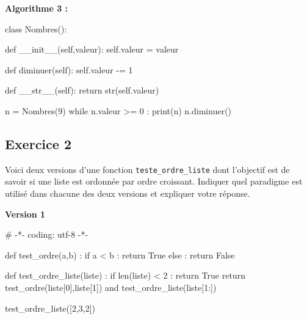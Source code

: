 \documentclass[
  a4paper,
  DIV=11,
  numbers=noendperiod]{scrartcl}
\newenvironment{Shaded}{\begin{snugshade}}{\end{snugshade}}
\newcommand{\BuiltInTok}[1]{\textcolor[rgb]{0.00,0.23,0.31}{#1}}
\newcommand{\CommentTok}[1]{\textcolor[rgb]{0.37,0.37,0.37}{#1}}
\newcommand{\ControlFlowTok}[1]{\textcolor[rgb]{0.00,0.23,0.31}{#1}}
\newcommand{\DecValTok}[1]{\textcolor[rgb]{0.68,0.00,0.00}{#1}}
\newcommand{\FunctionTok}[1]{\textcolor[rgb]{0.28,0.35,0.67}{#1}}
\newcommand{\KeywordTok}[1]{\textcolor[rgb]{0.00,0.23,0.31}{#1}}
\newcommand{\NormalTok}[1]{\textcolor[rgb]{0.00,0.23,0.31}{#1}}
\newcommand{\OperatorTok}[1]{\textcolor[rgb]{0.37,0.37,0.37}{#1}}
\newcommand{\VariableTok}[1]{\textcolor[rgb]{0.07,0.07,0.07}{#1}}
\begin{document}
\textbf{Algorithme 3 :}

\begin{Shaded}
\begin{Highlighting}[]
\KeywordTok{class}\NormalTok{ Nombres():}

    \KeywordTok{def} \FunctionTok{\_\_init\_\_}\NormalTok{(}\VariableTok{self}\NormalTok{,valeur):}
        \VariableTok{self}\NormalTok{.valeur }\OperatorTok{=}\NormalTok{ valeur}

    \KeywordTok{def}\NormalTok{ diminuer(}\VariableTok{self}\NormalTok{):}
        \VariableTok{self}\NormalTok{.valeur }\OperatorTok{{-}=} \DecValTok{1}

    \KeywordTok{def} \FunctionTok{\_\_str\_\_}\NormalTok{(}\VariableTok{self}\NormalTok{):}
        \ControlFlowTok{return} \BuiltInTok{str}\NormalTok{(}\VariableTok{self}\NormalTok{.valeur)}

\NormalTok{n }\OperatorTok{=}\NormalTok{ Nombres(}\DecValTok{9}\NormalTok{)}
\ControlFlowTok{while}\NormalTok{ n.valeur }\OperatorTok{\textgreater{}=} \DecValTok{0}\NormalTok{ :}
    \BuiltInTok{print}\NormalTok{(n)}
\NormalTok{    n.diminuer()}
\end{Highlighting}
\end{Shaded}

\hypertarget{fa-solid-pencil-alt-exercice-2}{%
\subsection{\texorpdfstring{ Exercice
2}{ Exercice 2}}\label{fa-solid-pencil-alt-exercice-2}}

Voici deux versions d'une fonction \texttt{teste\_ordre\_liste} dont
l'objectif est de savoir si une liste est ordonnée par ordre croissant.
Indiquer quel paradigme est utilisé dans chacune des deux versions et
expliquer votre réponse.

\textbf{Version 1}

\begin{Shaded}
\begin{Highlighting}[]
\CommentTok{\# {-}*{-} coding: utf{-}8 {-}*{-}}

\KeywordTok{def}\NormalTok{ test\_ordre(a,b) :}
    \ControlFlowTok{if}\NormalTok{ a }\OperatorTok{\textless{}}\NormalTok{ b :}
        \ControlFlowTok{return} \VariableTok{True}
    \ControlFlowTok{else}\NormalTok{ :}
        \ControlFlowTok{return} \VariableTok{False}

\KeywordTok{def}\NormalTok{ test\_ordre\_liste(liste) :}
    \ControlFlowTok{if} \BuiltInTok{len}\NormalTok{(liste) }\OperatorTok{\textless{}} \DecValTok{2}\NormalTok{ :}
        \ControlFlowTok{return} \VariableTok{True}
    \ControlFlowTok{return}\NormalTok{ test\_ordre(liste[}\DecValTok{0}\NormalTok{],liste[}\DecValTok{1}\NormalTok{]) }\KeywordTok{and}\NormalTok{ test\_ordre\_liste(liste[}\DecValTok{1}\NormalTok{:])}

\NormalTok{test\_ordre\_liste([}\DecValTok{2}\NormalTok{,}\DecValTok{3}\NormalTok{,}\DecValTok{2}\NormalTok{])}
\end{Highlighting}
\end{Shaded}
\end{document}
